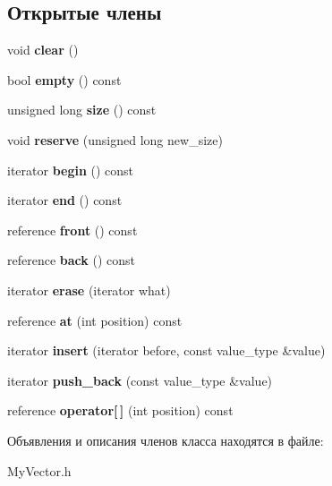 \subsection*{Открытые члены}
\begin{DoxyCompactItemize}
\item 
\mbox{\label{classvector_ac96708454c63cc77ec591a126e45d8ed}} 
void {\bfseries clear} ()
\item 
\mbox{\label{classvector_a0816fee1ef492c548470c5e6f67a9876}} 
bool {\bfseries empty} () const
\item 
\mbox{\label{classvector_a316268c2aaa12061dca02c32322a4e7b}} 
unsigned long {\bfseries size} () const
\item 
\mbox{\label{classvector_a5dd07d25eeb7305a94232f90a85eee15}} 
void {\bfseries reserve} (unsigned long new\+\_\+size)
\item 
\mbox{\label{classvector_abae3df4e384025fa11d9ef378b51aae6}} 
iterator {\bfseries begin} () const
\item 
\mbox{\label{classvector_a45a5f2296678f88ac748e596a7dc11f4}} 
iterator {\bfseries end} () const
\item 
\mbox{\label{classvector_a4391dcc0bd97e03c535e96a29c89846b}} 
reference {\bfseries front} () const
\item 
\mbox{\label{classvector_a936581fe884868460a9f9a0cb4d36371}} 
reference {\bfseries back} () const
\item 
\mbox{\label{classvector_a1dec97d1ec7cc96a1fb1e5d3a16f6d92}} 
iterator {\bfseries erase} (iterator what)
\item 
\mbox{\label{classvector_aaab8be14e32065a75760bf2d55b3b990}} 
reference {\bfseries at} (int position) const
\item 
\mbox{\label{classvector_a1772fa608912300c60aa70852f0fa49e}} 
iterator {\bfseries insert} (iterator before, const value\+\_\+type \&value)
\item 
\mbox{\label{classvector_a283b5a625ff755a60d34bd4607918509}} 
iterator {\bfseries push\+\_\+back} (const value\+\_\+type \&value)
\item 
\mbox{\label{classvector_a9b2e7b6715093f7c7565f5d35f7b9338}} 
reference {\bfseries operator\mbox{[}$\,$\mbox{]}} (int position) const
\end{DoxyCompactItemize}


Объявления и описания членов класса находятся в файле\+:\begin{DoxyCompactItemize}
\item 
My\+Vector.\+h\end{DoxyCompactItemize}
